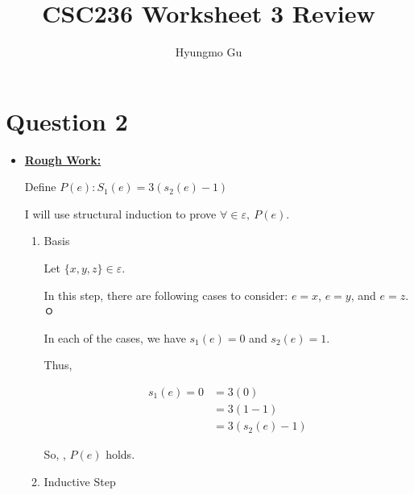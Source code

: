 \documentclass[12pt]{article}
\begin{document}
\title{CSC236 Worksheet 3 Review}
\author{Hyungmo Gu}
\maketitle

\section*{Question 2}
\begin{itemize}
    \item

    \begin{mdframed}
        \underline{\textbf{Rough Work:}}

        \bigskip

        Define $P(e):S_1(e) = 3(s_2(e) - 1)$

        \bigskip

        I will use structural induction to prove $\forall \in \varepsilon,\:P(e)$.

        \bigskip

        \begin{enumerate}[1.]
            \item Basis

            \begin{mdframed}
            Let $\{x,y,z\} \in \varepsilon$.

            \bigskip

            In this step, there are following cases to consider: $e = x$, $e = y$, and $e = z$.
 ㅇ
            \bigskip

            In each of the cases, we have $s_1(e) = 0$ and $s_2(e) = 1$.

            \bigskip

            Thus,

            \begin{align}
                s_1(e) = 0 &= 3(0)\\
                &= 3(1-1)\\
                &= 3(s_2(e) - 1)
            \end{align}

            \bigskip

            So, , $P(e)$ holds.
            \end{mdframed}
            \item Inductive Step

            \begin{mdframed}


\end{mdframed}
\end{enumerate}
\end{mdframed}
\end{itemize}
\end{document}
